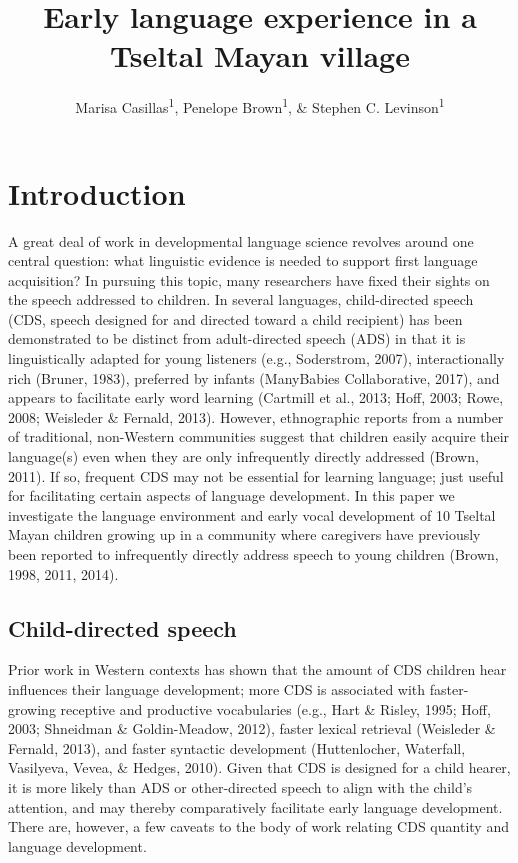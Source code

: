 \documentclass[floatsintext,man]{apa6}
\title{Early language experience in a Tseltal Mayan village}
\author{Marisa Casillas\textsuperscript{1}, Penelope Brown\textsuperscript{1}, \& Stephen C. Levinson\textsuperscript{1}}
\affiliation{
    \vspace{0.5cm}
          \textsuperscript{1} Max Planck Institute for Psycholinguistics  }
\theoremstyle{definition}
\theoremstyle{definition}
\theoremstyle{definition}
\theoremstyle{remark}
\begin{document}
\maketitle

\setcounter{secnumdepth}{0}



\section{Introduction}\label{intro}

A great deal of work in developmental language science revolves around
one central question: what linguistic evidence is needed to support
first language acquisition? In pursuing this topic, many researchers
have fixed their sights on the speech addressed to children. In several
languages, child-directed speech (CDS, speech designed for and directed
toward a child recipient) has been demonstrated to be distinct from
adult-directed speech (ADS) in that it is linguistically adapted for
young listeners (e.g., Soderstrom, 2007), interactionally rich (Bruner,
1983), preferred by infants (ManyBabies Collaborative, 2017), and
appears to facilitate early word learning (Cartmill et al., 2013; Hoff,
2003; Rowe, 2008; Weisleder \& Fernald, 2013). However, ethnographic
reports from a number of traditional, non-Western communities suggest
that children easily acquire their language(s) even when they are only
infrequently directly addressed (Brown, 2011). If so, frequent CDS may
not be essential for learning language; just useful for facilitating
certain aspects of language development. In this paper we investigate
the language environment and early vocal development of 10 Tseltal Mayan
children growing up in a community where caregivers have previously been
reported to infrequently directly address speech to young children
(Brown, 1998, 2011, 2014).

\subsection{Child-directed speech}\label{intro-cds}

Prior work in Western contexts has shown that the amount of CDS children
hear influences their language development; more CDS is associated with
faster-growing receptive and productive vocabularies (e.g., Hart \&
Risley, 1995; Hoff, 2003; Shneidman \& Goldin-Meadow, 2012), faster
lexical retrieval (Weisleder \& Fernald, 2013), and faster syntactic
development (Huttenlocher, Waterfall, Vasilyeva, Vevea, \& Hedges,
2010). Given that CDS is designed for a child hearer, it is more likely
than ADS or other-directed speech to align with the child's attention,
and may thereby comparatively facilitate early language development.
There are, however, a few caveats to the body of work relating CDS
quantity and language development.
\end{document}

